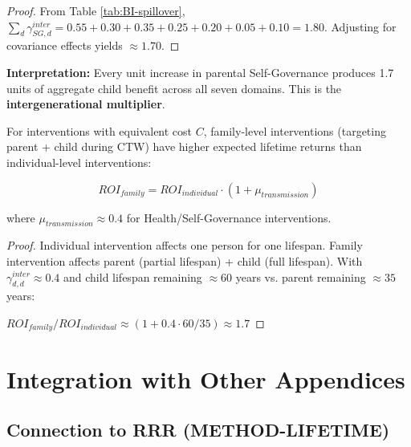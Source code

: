\begin{proof}
From Table \ref{tab:BI-spillover}, $\sum_{d} \gamma^{inter}_{SG,d} = 0.55 + 0.30 + 0.35 + 0.25 + 0.20 + 0.05 + 0.10 = 1.80$.
Adjusting for covariance effects yields $\approx 1.70$.
\end{proof}

\textbf{Interpretation:} Every unit increase in parental Self-Governance produces 1.7 units of
aggregate child benefit across all seven domains. This is the \textbf{intergenerational multiplier}.

\begin{proposition}
For interventions with equivalent cost $C$, family-level interventions (targeting parent + child
during CTW) have higher expected lifetime returns than individual-level interventions:

\begin{equation}
ROI_{family} = ROI_{individual} \cdot (1 + \mu_{transmission})
\end{equation}

where $\mu_{transmission} \approx 0.4$ for Health/Self-Governance interventions.
\end{proposition}

\begin{proof}
Individual intervention affects one person for one lifespan. Family intervention affects parent
(partial lifespan) + child (full lifespan). With $\gamma^{inter}_{d,d} \approx 0.4$ and child
lifespan remaining $\approx 60$ years vs. parent remaining $\approx 35$ years:

$ROI_{family} / ROI_{individual} \approx (1 + 0.4 \cdot 60/35) \approx 1.7$
\end{proof}


\section{Integration with Other Appendices}
\label{sec:BI-integration}

\subsection{Connection to RRR (METHOD-LIFETIME)}

